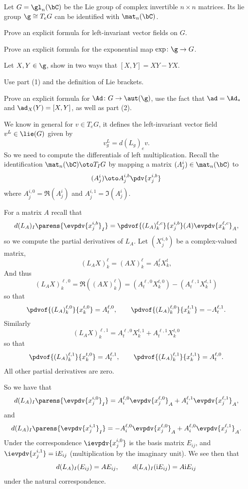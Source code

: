     Let $G=\gl_n(\bC)$ be the Lie group of complex invertible $n\times n$ matrices.
    Its lie group $\g\cong T_eG$ can be identified with $\mat_n(\bC)$.
    \benum
        \item Prove an explicit formula for left-invariant vector fields on $G$.
        \item Prove an explicit formula for the exponential map $\exp\colon\g\to G$.
        \item Let $X,Y\in\g$, show in two ways that $[X,Y]=XY-YX$.
        \benum
            \item Use part (1) and the definition of Lie brackets.
            \item Prove an explicit formula for $\Ad\colon G\to\aut(\g)$, use the fact that $\ad=\Ad_*$ and $\ad_X(Y)=[X,Y]$, as well as
            part (2).
        \eenum
    \eenum

\eprob

\def\i{{\rm i}}

\benum
    \item We know in general for $v\in T_eG$, it defines the left-invariant vector field $v^L\in\lie(G)$ given by
    $$ v^L_g = d(L_g)_ev . $$
    So we need to compute the differentials of left multiplication.
    Recall the identification $\mat_n(\bC)\oto T_IG$ by mapping a matrix $(A^i_j)\in\mat_n(\bC)$ to
    $$ (A^i_j) \oto A^{i,b}_j\pdv{x^{i,b}_j} $$
    where $A^{i,0}_j=\Re(A^i_j)$ and $A^{i,1}_j=\Im(A^i_j)$.

    For a matrix $A$ recall that
    $$ d(L_A)_I\parens{\evpdv{x^{i,b}_j}_I} = \pdvof{(L_A)^{\ell,c}_k}{x^{i,b}_j}(A) \evpdv{x^{\ell,c}_k}_A , $$
    so we compute the partial derivatives of $L_A$.
    Let $(X^{i,b}_j)$ be a complex-valued matrix,
    $$ (L_AX)^\ell_k = (AX)^\ell_k = A^\ell_t X^t_k , $$
    And thus
    $$ (L_AX)^{\ell,0}_k = \Re((AX)^\ell_k) = (A^{\ell,0}_tX^{t,0}_k) - (A^{\ell,1}_tX^{t,1}_k) $$
    so that
    $$ \pdvof{(L_A)^{\ell,0}_k}{x^{t,0}_k} = A^{\ell,0}_t,\qquad \pdvof{(L_A)^{\ell,0}_k}{x^{t,1}_k} = - A^{\ell,1}_t . $$
    Similarly
    $$ (L_AX)^{\ell,1}_k = A^{\ell,0}_tX^{t,1}_k + A^{\ell,1}_tX^{t,0}_k $$
    so that
    $$ \pdvof{(L_A)^{\ell,1}_k}{x^{t,0}_k} = A^{\ell,1}_t,\qquad \pdvof{(L_A)^{\ell,1}_k}{x^{t,1}_k} = A^{\ell,0}_t . $$
    All other partial derivatives are zero.

    So we have that
    $$ d(L_A)_I\parens{\evpdv{x^{i,0}_j}_I} = A^{\ell,0}_i\evpdv{x^{\ell,0}_j}_A + A^{\ell,1}_i\evpdv{x^{\ell,1}_j}_A , $$
    and
    $$ d(L_A)_I\parens{\evpdv{x^{i,1}_j}_I} = -A^{\ell,0}_i\evpdv{x^{\ell,0}_j}_A + A^{\ell,0}_i\evpdv{x^{\ell,1}_j}_A . $$
    Under the correspondence $\ievpdv{x^{i,0}_j}$ is the basis matrix $E_{ij}$, and $\ievpdv{x^{i,1}_j}=\i E_{ij}$ (multiplication by
    the imaginary unit).
    We see then that
    $$ d(L_A)_I(E_{ij}) = AE_{ij},\qquad d(L_A)_I(\i E_{ij}) = A\i E_{ij} $$
    under the natural correspondence.

